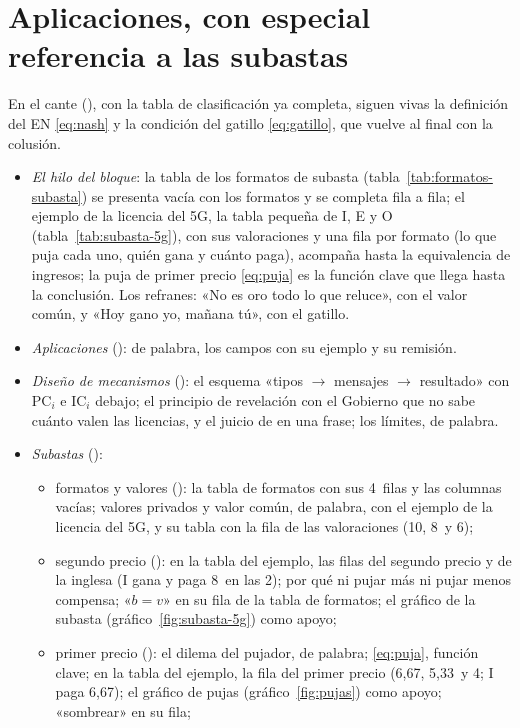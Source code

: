 \documentclass[11pt]{article}
\begin{document}
\section{Aplicaciones, con especial referencia a las subastas}\label{sec:aplicaciones-subastas}

\begin{notaopositor}
En el cante (), con la tabla de clasificación ya completa, siguen vivas la definición del EN \eqref{eq:nash} y la condición del gatillo \eqref{eq:gatillo}, que vuelve al final con la colusión.
\begin{itemize}
\item \emph{El hilo del bloque}: la tabla de los formatos de subasta (tabla~\ref{tab:formatos-subasta}) se presenta vacía con los formatos y se completa fila a fila; el ejemplo de la licencia del 5G, la tabla pequeña de \textup{I}, E y O (tabla~\ref{tab:subasta-5g}), con sus valoraciones y una fila por formato (lo que puja cada uno, quién gana y cuánto paga), acompaña hasta la equivalencia de ingresos; la puja de primer precio \eqref{eq:puja} es la función clave que llega hasta la conclusión. Los refranes: «No es oro todo lo que reluce», con el valor común, y «Hoy gano yo, mañana tú», con el gatillo.
\item \emph{Aplicaciones} (): de palabra, los campos con su ejemplo y su remisión.
\item \emph{Diseño de mecanismos} (): el esquema «tipos $\to$ mensajes $\to$ resultado» con $\mathrm{PC}_i$ e $\mathrm{IC}_i$ debajo; el principio de revelación con el Gobierno que no sabe cuánto valen las licencias, y el juicio de  en una frase; los límites, de palabra.
\item \emph{Subastas} ():
  \begin{itemize}
  \item formatos y valores (): la tabla de formatos con sus 4~filas y las columnas vacías; valores privados y valor común, de palabra, con el ejemplo de la licencia del 5G, y su tabla con la fila de las valoraciones (10, 8~y 6);
  \item segundo precio (): en la tabla del ejemplo, las filas del segundo precio y de la inglesa (\textup{I} gana y paga 8~en las 2); por qué ni pujar más ni pujar menos compensa; «$b=v$» en su fila de la tabla de formatos; el gráfico de la subasta (gráfico~\ref{fig:subasta-5g}) como apoyo;
  \item primer precio (): el dilema del pujador, de palabra; \eqref{eq:puja}, función clave; en la tabla del ejemplo, la fila del primer precio (6,67, 5,33~y 4; \textup{I} paga 6,67); el gráfico de pujas (gráfico~\ref{fig:pujas}) como apoyo; «sombrear» en su fila;

\end{itemize}
\end{itemize}
\end{notaopositor}
\end{document}
